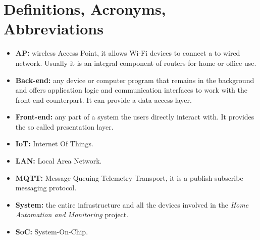 \section{Definitions, Acronyms, Abbreviations}

\begin{itemize}
	\item \textbf{AP:} wireless Access Point, it allows Wi-Fi devices to connect a to wired network. Usually it is an integral component of routers for home or office use.
	\item \textbf{Back-end:} any device or computer program that remains in the background and offers application logic and communication interfaces to work with the front-end counterpart. It can provide a data access layer.
	\item \textbf{Front-end:} any part of a system the users directly interact with. It provides the so called presentation layer.
	\item \textbf{IoT:} Internet Of Things.
	\item \textbf{LAN:} Local Area Network.
	\item \textbf{MQTT:} Message Queuing Telemetry Transport, it is a publish-subscribe messaging protocol.
	\item \textbf{System:} the entire infrastructure and all the devices involved in the \textit{Home Automation and Monitoring} project.
	\item \textbf{SoC:} System-On-Chip.
\end{itemize}